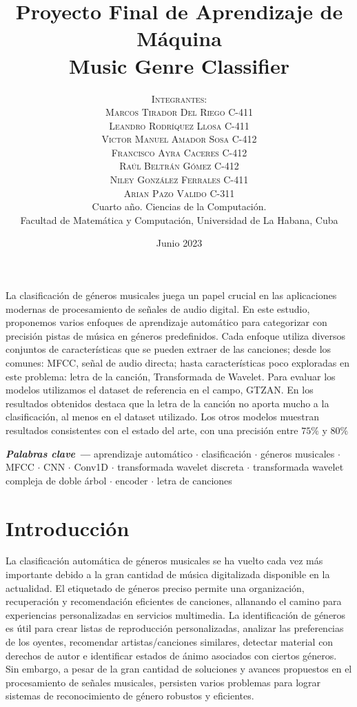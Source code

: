 \documentclass[colorinlistoftodos,twoside,twocolumn,10pt]{article} %
\title{\normalsize{Proyecto Final de Aprendizaje de Máquina}\\
	\Huge\bfseries Music Genre Classifier\\
} %
\author{%
	\normalsize\textsc{Integrantes:}\\
	\normalsize\textsc{Marcos Tirador Del Riego  C-411}\\
	\normalsize\textsc{Leandro Rodr\'iquez Llosa  C-411}\\
	\normalsize\textsc{Victor Manuel Amador Sosa C-412}\\
	\normalsize\textsc{Francisco Ayra Caceres C-412}\\
	\normalsize\textsc{Ra\'ul Beltr\'an G\'omez C-412}\\
	\normalsize\textsc{Niley Gonz\'alez Ferrales  C-411}\\
	\normalsize\textsc{Arian Pazo Valido  C-311} \\[2ex]
	\small Cuarto a\~no. Ciencias de la Computaci\'on. \\ %
	\small Facultad de Matem\'atica y Computaci\'on, Universidad de La Habana, Cuba \\ %
}
\date{\footnotesize Junio 2023 } %
\providecommand{\keywords}[1]
{
	\small	
	\vspace{0.5em}
	\noindent \textbf{\textit{Palabras clave --- }} #1
}
\renewenvironment{abstract}
{\small
	\begin{center}
		\bfseries \abstractname\vspace{-.5em}\vspace{0pt}
	\end{center}
	\list{}{
		\setlength{\leftmargin}{0.9cm}%
		\setlength{\rightmargin}{\leftmargin}%
	}%
	\item\relax}
{\endlist}
\begin{document}
	\maketitle

	\begin{abstract}

La clasificación de géneros musicales juega un papel crucial en las aplicaciones modernas de procesamiento de señales de audio digital. En este estudio, proponemos varios enfoques de aprendizaje automático para categorizar con precisión pistas de música en géneros predefinidos. Cada enfoque utiliza diversos conjuntos de características que se pueden extraer de las canciones; desde los comunes: MFCC, señal de audio directa; hasta características poco exploradas en este problema: letra de la canción, Transformada de Wavelet. Para evaluar los modelos utilizamos el dataset de referencia en el campo, GTZAN. En los resultados obtenidos destaca que la letra de la canción no aporta mucho a la clasificación, al menos en el dataset utilizado. Los otros modelos muestran resultados consistentes con el estado del arte, con una precisión entre $75\%$ y $80\%$

		\vspace{1em}
		\keywords{ 
			aprendizaje automático \textbf{$\cdot$} clasificación \textbf{$\cdot$}  géneros musicales \textbf{$\cdot$} MFCC  \textbf{$\cdot$} CNN  \textbf{$\cdot$} Conv1D \textbf{$\cdot$} transformada wavelet discreta \textbf{$\cdot$} transformada wavelet compleja de doble árbol  \textbf{$\cdot$} encoder  \textbf{$\cdot$} letra de canciones 
		}

	\end{abstract}
	
	
	\section{Introducción}
	La clasificación automática de géneros musicales se ha vuelto cada vez más importante debido a la gran cantidad de música digitalizada disponible en la actualidad. El etiquetado de géneros preciso permite una organización, recuperación y recomendación eficientes de canciones, allanando el camino para experiencias personalizadas en servicios multimedia. La identificación de géneros es útil para crear listas de reproducción personalizadas, analizar las preferencias de los oyentes, recomendar artistas/canciones similares, detectar material con derechos de autor e identificar estados de ánimo asociados con ciertos géneros. Sin embargo, a pesar de la gran cantidad de soluciones y avances propuestos en el procesamiento de señales musicales, persisten varios problemas para lograr sistemas de reconocimiento de género robustos y eficientes.
\end{document}
